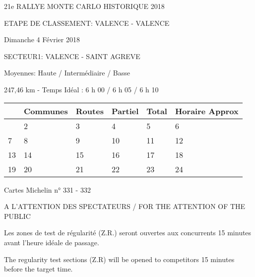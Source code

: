 \documentclass{article}%
\begin{document}
%
\normalsize%
\begin{center} \LARGE{ 21e RALLYE MONTE CARLO HISTORIQUE 2018
} \end{center}%
\begin{center} ETAPE DE CLASSEMENT: VALENCE - VALENCE
 \end{center}%
\begin{flushright} Dimanche 4 Février 2018
 \end{flushright}%
\begin{flushleft} SECTEUR1: VALENCE - SAINT AGREVE \end{flushleft}%
\begin{flushright} Moyennes: Haute / Intermédiaire / Basse \end{flushright}%
\begin{flushright} 247,46 km - Temps Idéal : 6 h 00 / 6 h 05 / 6 h 10 \end{flushright}%
\begin{longtable}{p{2.5cm}|p{5.0cm}|p{1.5cm}|p{1.5cm}|p{1.5cm}|p{3.5cm}}%
\hline%
&Communes&Routes&Partiel&Total&Horaire Approx\\%
\hline%
\endhead%
\endfoot%
\endlastfoot%
1&2&3&4&5&6\\%
7&8&9&10&11&12\\%
13&14&15&16&17&18\\%
19&20&21&22&23&24\\%
\hline%
\end{longtable}%
\begin{flushleft} Cartes Michelin n° 331 - 332 \end{flushleft}%
\begin{center} A L’ATTENTION DES SPECTATEURS / FOR THE ATTENTION OF THE PUBLIC  \end{center}%
\begin{center} Les zones de test de régularité (Z.R.) seront ouvertes aux concurrents 15 minutes avant l’heure idéale de passage. \end{center}%
\begin{center} The regularity test sections (Z.R) will be opened to competitors 15 minutes before the target time.
 \end{center}%
\end{document}
